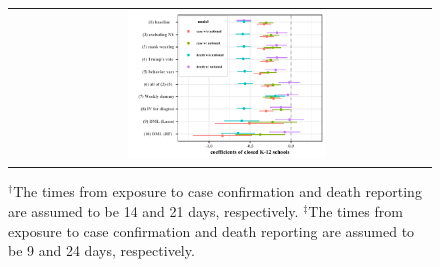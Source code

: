 \documentclass[11pt,reqno,letter]{amsart}
\theoremstyle{definition}
\begin{document}
\begin{figure}[ht]
\begin{minipage}{\linewidth}
\begin{tabular}{cc}
      &
      \includegraphics[width=0.5\textwidth]{tables_and_figures/pk12-whisker-7}
          \end{tabular}
  \end{minipage}  
    \begin{flushleft}
      \footnotesize
      $^\dagger$The times from exposure to case confirmation and death reporting  are assumed to be 14 and 21 days, respectively. $^\ddagger$The times from exposure to case confirmation and death reporting  are assumed to be 9 and 24 days, respectively. 
    \end{flushleft}
\end{figure}
   
\end{document}
